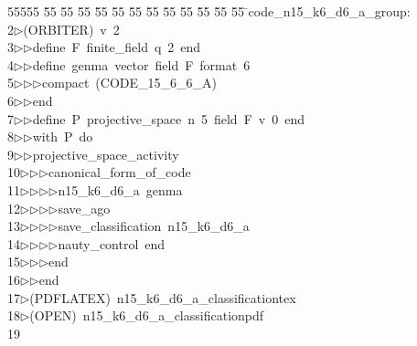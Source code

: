 %
%
\begin{tabbing}
55555 \= 55 \= 55 \= 55 \= 55 \= 55 \= 55 \= 55 \= 55 \= 55 \= 55 \= 55 \= 55 \= \>code\_n15\_k6\_d6\_a\_group:\\[0pt]
2\>$\triangleright$\>(ORBITER)\ v\ 2\ \\[0pt]
3\>$\triangleright$\>$\triangleright$\>define\ F\ finite\_field\ q\ 2\ end\ \\[0pt]
4\>$\triangleright$\>$\triangleright$\>define\ genma\ vector\ field\ F\ format\ 6\ \\[0pt]
5\>$\triangleright$\>$\triangleright$\>$\triangleright$\>compact\ (CODE\_15\_6\_6\_A)\ \\[0pt]
6\>$\triangleright$\>$\triangleright$\>end\ \\[0pt]
7\>$\triangleright$\>$\triangleright$\>define\ P\ projective\_space\ n\ 5\ field\ F\ v\ 0\ end\ \\[0pt]
8\>$\triangleright$\>$\triangleright$\>with\ P\ do\ \\[0pt]
9\>$\triangleright$\>$\triangleright$\>projective\_space\_activity\ \\[0pt]
10\>$\triangleright$\>$\triangleright$\>$\triangleright$\>canonical\_form\_of\_code\ \\[0pt]
11\>$\triangleright$\>$\triangleright$\>$\triangleright$\>$\triangleright$\>n15\_k6\_d6\_a\ genma\ \\[0pt]
12\>$\triangleright$\>$\triangleright$\>$\triangleright$\>$\triangleright$\>save\_ago\ \\[0pt]
13\>$\triangleright$\>$\triangleright$\>$\triangleright$\>$\triangleright$\>save\_classification\ n15\_k6\_d6\_a\ \\[0pt]
14\>$\triangleright$\>$\triangleright$\>$\triangleright$\>$\triangleright$\>nauty\_control\ end\ \\[0pt]
15\>$\triangleright$\>$\triangleright$\>$\triangleright$\>end\ \\[0pt]
16\>$\triangleright$\>$\triangleright$\>end\\[0pt]
17\>$\triangleright$\>(PDFLATEX)\ n15\_k6\_d6\_a\_classificationtex\\[0pt]
18\>$\triangleright$\>(OPEN)\ n15\_k6\_d6\_a\_classificationpdf\\[0pt]
19\>\end{tabbing}
